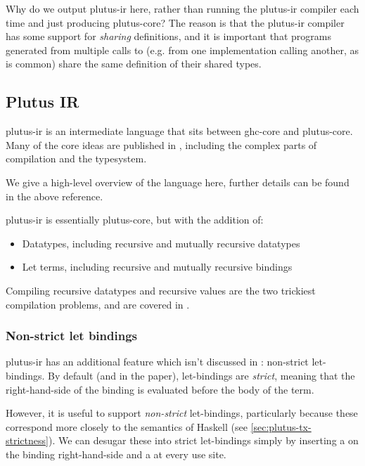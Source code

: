 Why do we output \gls{plutus-ir} here, rather than running the \gls{plutus-ir} compiler each time and just producing \gls{plutus-core}?
The reason is that the \gls{plutus-ir} compiler has some support for \emph{sharing} definitions, and it is important that programs generated from multiple calls to  (e.g. from one implementation calling another, as is common) share the same definition of their shared types.

\subsection{Plutus IR}
\label{sec:plutus-ir}

\Gls{plutus-ir} is an intermediate language that sits between \gls{ghc-core} and \gls{plutus-core}.
Many of the core ideas are published in \textcite{peytonjones2019unraveling}, including the complex parts of compilation and the typesystem.

We give a high-level overview of the language here, further details can be found in the above reference.

\Gls{plutus-ir} is essentially \gls{plutus-core}, but with the addition of:
\begin{itemize}
\item Datatypes, including recursive and mutually recursive datatypes
\item Let terms, including recursive and mutually recursive bindings
\end{itemize}

Compiling recursive datatypes and recursive values are the two trickiest compilation problems, and are covered in \textcite{peytonjones2019unraveling}.

\subsubsection{Non-strict let bindings}
\label{sec:pir-non-strict}

\Gls{plutus-ir} has an additional feature which isn't discussed in \textcite{peytonjones2019unraveling}: non-strict let-bindings.
By default (and in the paper), let-bindings are \emph{strict}, meaning that the right-hand-side of the binding is evaluated before the body of the term.

However, it is useful to support \emph{non-strict} let-bindings, particularly because these correspond more closely to the semantics of Haskell (see \cref{sec:plutus-tx-strictness}).
We can desugar these into strict let-bindings simply by inserting a  on the binding right-hand-side and a  at every use site.

